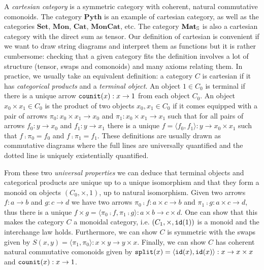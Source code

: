A \emph{cartesian category} is a symmetric category with coherent, natural commutative comonoids.
The category $\mathbf{Pyth}$ is an example of cartesian category, as well as the categories $\mathbf{Set}$, $\mathbf{Mon}$, $\mathbf{Cat}$, $\mathbf{MonCat}$, etc.
The category $\mathbf{Mat}_\S$ is also a cartesian category with the direct sum as tensor.
Our definition of cartesian is convenient if we want to draw string diagrams and interpret them as functions but it is rather cumbersome: checking that a given category fits the definition involves a lot of structure (tensor, swaps and comonoids) and many axioms relating them.
In practice, we usually take an equivalent definition: a category $C$ is cartesian if it has \emph{categorical products} and a \emph{terminal object}.
An object $1 \in C_0$ is terminal if there is a unique arrow $\counit(x) : x \to 1$ from each object $C_0$.
An object $x_0 \times x_1 \in C_0$ is the product of two objects $x_0, x_1 \in C_0$ if it comes equipped with a pair of arrows $\pi_0 : x_0 \times x_1 \to x_0$ and $\pi_1 : x_0 \times x_1 \to x_1$
such that for all pairs of arrows $f_0 : y \to x_0$ and $f_1 : y \to x_1$ there is a unique $f = \langle f_0, f_1 \rangle : y \to x_0 \times x_1$ such that $f \fcmp \pi_0 = f_0$ and $f \fcmp \pi_1 = f_1$.
These definitions are usually drawn as commutative diagrams where the full lines are universally quantified and the dotted line is uniquely existentially quantified.

From these two \emph{universal properties} we can deduce that terminal objects and categorical products are unique up to a unique isomorphism and that they form a monoid on objects $(C_0, \times, 1)$, up to natural isomorphism.
Given two arrows $f : a \to b$ and $g : c \to d$ we have two arrows $\pi_0 \fcmp f : a \times c \to b$ and $\pi_1 \fcmp g : a \times c \to d$, thus there is a unique $f \times  g = \langle \pi_0 \fcmp f, \pi_1 \fcmp g \rangle : a \times b \to c \times d$.
One can show that this makes the category $C$ a monoidal category, i.e. $(C_1, \times, \id(1))$ is a monoid and the interchange law holds.
Furthermore, we can show $C$ is symmetric with the swaps given by $S(x, y) = \langle \pi_1, \pi_0 \rangle : x \times y \to y \times x$.
Finally, we can show $C$ has coherent natural commutative comonoids given by $\ttsplit(x) = \langle \id(x), \id(x) \rangle : x \to x \times x$ and $\counit(x) : x \to 1$.

